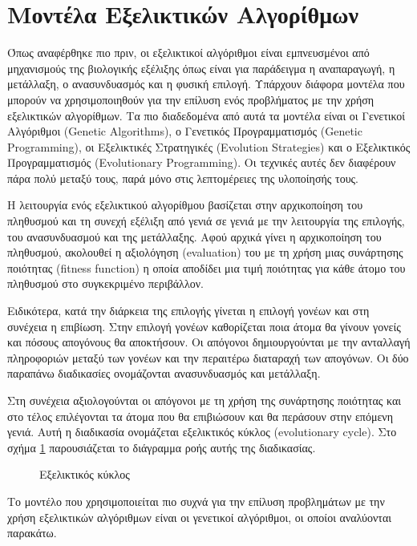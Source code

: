 \section{Μοντέλα Εξελικτικών Αλγορίθμων}
Όπως αναφέρθηκε πιο πριν, οι εξελικτικοί αλγόριθμοι είναι εμπνευσμένοι από μηχανισμούς της βιολογικής εξέλιξης όπως είναι για παράδειγμα η αναπαραγωγή, η μετάλλαξη, ο ανασυνδυασμός και η φυσική επιλογή. \cite{_evolutionary_2014} Υπάρχουν διάφορα μοντέλα που μπορούν να χρησιμοποιηθούν για την επίλυση ενός προβλήματος με την χρήση εξελικτικών αλγορίθμων. Τα πιο διαδεδομένα από αυτά τα μοντέλα είναι οι Γενετικοί Αλγόριθμοι (Genetic Algorithms), ο Γενετικός Προγραμματισμός (Genetic Programming), οι Εξελικτικές Στρατηγικές (Evolution Strategies) και ο Εξελικτικός Προγραμματισμός (Evolutionary Programming). Οι τεχνικές αυτές δεν διαφέρουν πάρα πολύ μεταξύ τους, παρά μόνο στις λεπτομέρειες της υλοποίησής τους. \cite{Adamidis}

Η λειτουργία ενός εξελικτικού αλγορίθμου βασίζεται στην αρχικοποίηση του πληθυσμού και τη συνεχή εξέλιξη από γενιά σε γενιά με την λειτουργία της επιλογής, του ανασυνδυασμού και της μετάλλαξης. Αφού αρχικά γίνει η αρχικοποίηση του πληθυσμού, ακολουθεί η αξιολόγηση (evaluation) του με τη χρήση μιας συνάρτησης ποιότητας (fitness function) η οποία αποδίδει μια τιμή ποιότητας για κάθε άτομο του πληθυσμού στο συγκεκριμένο περιβάλλον.

Ειδικότερα, κατά την διάρκεια της επιλογής γίνεται η επιλογή γονέων και στη συνέχεια η επιβίωση. Στην επιλογή γονέων καθορίζεται ποια άτομα θα γίνουν γονείς και πόσους απογόνους θα αποκτήσουν. Οι απόγονοι δημιουργούνται με την ανταλλαγή πληροφοριών μεταξύ των γονέων και την περαιτέρω διαταραχή των απογόνων. Οι δύο παραπάνω διαδικασίες ονομάζονται ανασυνδυασμός και μετάλλαξη.

Στη συνέχεια αξιολογούνται οι απόγονοι με τη χρήση της συνάρτησης ποιότητας και στο τέλος επιλέγονται τα άτομα που θα επιβιώσουν και θα περάσουν στην επόμενη γενιά. Αυτή η διαδικασία ονομάζεται εξελικτικός κύκλος (evolutionary cycle). Στο σχήμα \ref{fig_evCycl} παρουσιάζεται το διάγραμμα ροής αυτής της διαδικασίας.

\begin{figure}[!t]
    \centering
    \def\svgwidth{2.1in}
    
    \caption{Εξελικτικός κύκλος}
    \label{fig_evCycl}
\end{figure}

Το μοντέλο που χρησιμοποιείται πιο συχνά για την επίλυση προβλημάτων με την χρήση εξελικτικών αλγόριθμων είναι οι γενετικοί αλγόριθμοι, οι οποίοι αναλύονται παρακάτω.

